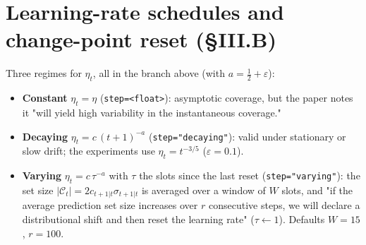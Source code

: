 \documentclass[11pt]{article}
\theoremstyle{plain}
\theoremstyle{definition}
\newcommand{\C}{\mathcal{C}}
\newcommand{\code}[1]{\texttt{#1}}
\begin{document}
\section{Learning-rate schedules and change-point reset (\S III.B)}\label{sec:schedules}
Three regimes for $\eta_t$, all in the branch above (with $a=\tfrac12+\varepsilon$):
\begin{itemize}[leftmargin=1.4em,itemsep=2pt]
\item \textbf{Constant} $\eta_t=\eta$ (\code{step=<float>}): asymptotic coverage, but the paper notes it "will yield high variability in the instantaneous coverage."
\item \textbf{Decaying} $\eta_t=c\,(t{+}1)^{-a}$ (\code{step="decaying"}): valid under stationary or slow drift; the experiments use $\eta_t=t^{-3/5}$ ($\varepsilon=0.1$).
\item \textbf{Varying} $\eta_t=c\,\tau^{-a}$ with $\tau$ the slots since the last reset (\code{step="varying"}): the set size $|\C_t|=2c_{t+1|t}\sigma_{t+1|t}$ is averaged over a window of $W$ slots, and "if the average prediction set size increases over $r$ consecutive steps, we will declare a distributional shift and then reset the learning rate" ($\tau\leftarrow1$). Defaults $W=15$, $r=100$.
\end{itemize}

\end{document}
